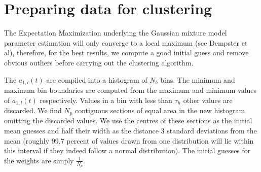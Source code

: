 \section{Preparing data for clustering}
The Expectation Maximization underlying the Gaussian mixture model parameter
estimation will only converge to a local maximum (see Dempster et al), therefore, for the best
results, we compute a good initial guess and remove obvious outliers before
carrying out the clustering algorithm.

The $a_{1,l}(t)$ are compiled into a histogram of $N_{b}$ bins. The minimum and
maximum bin boundaries are computed from the maximum and minimum values of
$a_{1,l}(t)$ respectively. Values in a bin with less than $\tau_{h}$ other
values are discarded. We find $N_{p}$ contiguous sections of equal area in the
new histogram omitting the discarded values.  We use the centres of these
sections as the initial mean guesses and half their width as the distance 3
standard deviations from the mean (roughly 99.7 percent of values drawn from one
distribution will lie within this interval if they indeed follow a normal
distribution). The initial guesses for the weights are simply $\frac{1}{N_{p}}$.


